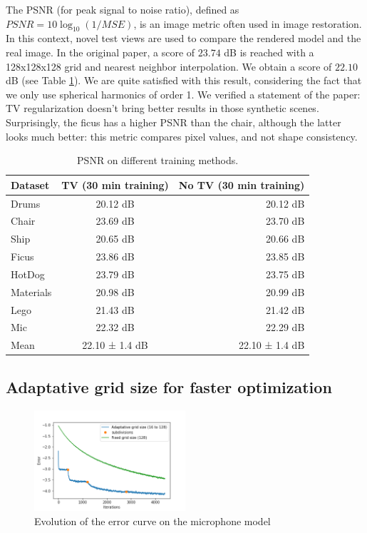 \documentclass{article}
\begin{document}
The PSNR (for peak signal to noise ratio), defined as $PSNR = 10\log_{10}(1/MSE)$, is an image metric often used in image restoration. In this context, novel test views are used to compare the rendered model and the real image. In the original paper, a score of $23.74$ dB is reached with a 128x128x128 grid and nearest neighbor interpolation. We obtain a score of $22.10$ dB (see Table \ref{tab:psnr}). We are quite satisfied with this result, considering the fact that we only use spherical harmonics of order 1. We verified a statement of the paper: TV regularization doesn't bring better results in those synthetic scenes. Surprisingly, the ficus has a higher PSNR than the chair, although the latter looks much better: this metric compares pixel values, and not shape consistency. 

\begin{table}[!h]
\centering
\begin{tabular}{|l||c|r|}
\hline
Dataset & TV (30 min training) & No TV (30 min training) \\\hline
Drums & 20.12 dB & 20.12 dB \\
Chair & 23.69 dB & 23.70 dB \\ 
Ship & 20.65  dB & 20.66 dB\\
Ficus & 23.86 dB & 23.85 dB\\
HotDog &  23.79 dB &  23.75 dB  \\
Materials &  20.98 dB &  20.99 dB \\
Lego &   21.43 dB &  21.42 dB  \\
Mic &  22.32 dB & 22.29 dB \\

\hline \hline
Mean & 22.10 ± 1.4  dB & 22.10 ± 1.4 dB \\
\hline 
\end{tabular}
\caption{\label{tab:psnr}PSNR on different training methods.}
\end{table}

\subsection{Adaptative grid size for faster optimization}


\begin{figure}[!h]
\centering
\includegraphics[width=0.5\textwidth]{figs/training_mic.png}
\caption{\label{fig:subd} Evolution of the error curve on the microphone model}
\end{figure}
\end{document}

